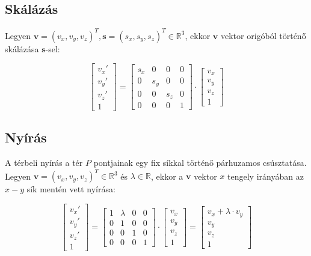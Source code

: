 \subsection{Skálázás}

Legyen $\mathbf{v}=(v_x, v_y, v_z)^T, \mathbf{s}=(s_x, s_y, s_z)^T\in\mathbb{R}^3$, ekkor $\mathbf{v}$ vektor origóból történő skálázása $\mathbf{s}$-sel:

\[\left[\begin{array}{c}v_x' \\v_y' \\v_z' \\ 1 \end{array}\right] = \left[\begin{array}{cccc}s_x & 0 & 0 & 0\\0 & s_y & 0 & 0\\ 0 & 0 & s_z & 0\\ 0 & 0 & 0 & 1\end{array}\right] \cdot \left[\begin{array}{c}v_x\\ v_y\\ v_z\\ 1\end{array}\right]\]

\subsection{Nyírás}

A térbeli nyírás a tér $P$ pontjainak egy fix síkkal történő párhuzamos csúsztatása. Legyen $\mathbf{v}=(v_x, v_y, v_z)^T\in\mathbb{R}^3$ és $\lambda\in\mathbb{R}$, ekkor a $\mathbf{v}$ vektor $x$ tengely irányában az $x-y$ sík mentén vett nyírása:

\[\left[\begin{array}{c}v_x' \\v_y' \\v_z' \\ 1 \end{array}\right] = \left[\begin{array}{cccc}1 & \lambda & 0 & 0\\0 & 1 & 0 & 0\\ 0 & 0 & 1 & 0\\ 0 & 0 & 0 & 1\end{array}\right] \cdot \left[\begin{array}{c}v_x\\ v_y\\ v_z\\ 1\end{array}\right] = \left[\begin{array}{c}v_x + \lambda\cdot v_y\\ v_y\\ v_z\\ 1\end{array}\right]\]

